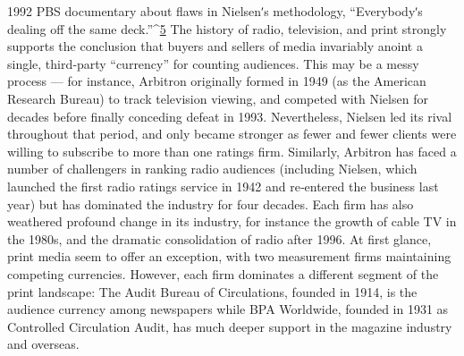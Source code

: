 1992 PBS documentary about flaws in Nielsenʹs methodology,
``Everybodyʹs dealing off the same deck.''^{\href{#endnotes}{5}}
The history of radio, television, and print strongly supports the conclusion
that buyers and sellers of media invariably anoint a single, third‐party
``currency'' for counting audiences. This may be a messy process — for
instance, Arbitron originally formed in 1949 (as the American Research
Bureau) to track television viewing, and competed with Nielsen for
decades before finally conceding defeat in 1993. Nevertheless, Nielsen led
its rival throughout that period, and only became stronger as fewer and
fewer clients were willing to subscribe to more than one ratings firm.
Similarly, Arbitron has faced a number of challengers in ranking radio
audiences (including Nielsen, which launched the first radio ratings
service in 1942 and re‐entered the business last year) but has dominated
the industry for four decades. Each firm has also weathered profound
change in its industry, for instance the growth of cable TV in the 1980s,
and the dramatic consolidation of radio after 1996.
At first glance, print media seem to offer an exception, with two
measurement firms maintaining competing currencies. However, each
firm dominates a different segment of the print landscape: The Audit
Bureau of Circulations, founded in 1914, is the audience currency among
newspapers while BPA Worldwide, founded in 1931 as Controlled
Circulation Audit, has much deeper support in the magazine industry and
overseas.


